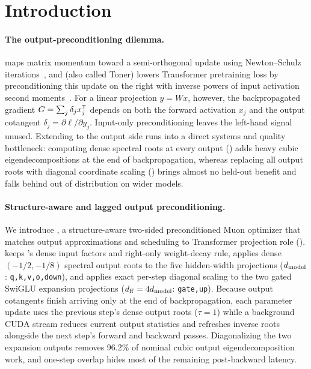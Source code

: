 \section{Introduction}
\label{sec:intro}

\paragraph{The output-preconditioning dilemma.}
 maps matrix momentum toward a semi-orthogonal update using Newton--Schulz iterations~\citep{jordan2024muon}, and  (also called Toner) lowers Transformer pretraining loss by preconditioning this update on the right with inverse powers of input activation second moments~\citep{mohamadi2026toner}. For a linear projection $y=Wx$, however, the backpropagated gradient $G=\sum_j\delta_jx_j^{{\mathsf{T}}}$ depends on both the forward activation $x_j$ and the output cotangent $\delta_j=\partial\ell/\partial y_j$. Input-only preconditioning leaves the left-hand signal unused. Extending  to the output side runs into a direct systems and quality bottleneck: computing dense spectral roots at every output () adds heavy cubic eigendecompositions at the end of backpropagation, whereas replacing all output roots with diagonal coordinate scaling () brings almost no held-out benefit and falls behind  out of distribution on wider models.

\paragraph{Structure-aware and lagged output preconditioning.}
We introduce , a structure-aware two-sided preconditioned Muon optimizer that matches output approximations and scheduling to Transformer projection role ().  keeps 's dense input factors and right-only weight-decay rule, applies dense $(-1/2,-1/8)$ spectral output roots to the five hidden-width projections ($d_{\mathrm{model}}$: \texttt{q,k,v,o,down}), and applies exact per-step diagonal scaling to the two gated SwiGLU expansion projections ($d_{\mathrm{ff}}=4d_{\mathrm{model}}$: \texttt{gate,up}). Because output cotangents finish arriving only at the end of backpropagation, each parameter update uses the previous step's dense output roots ($\tau=1$) while a background CUDA stream reduces current output statistics and refreshes inverse roots alongside the next step's forward and backward passes. Diagonalizing the two expansion outputs removes 96.2\% of nominal cubic output eigendecomposition work, and one-step overlap hides most of the remaining post-backward latency.

